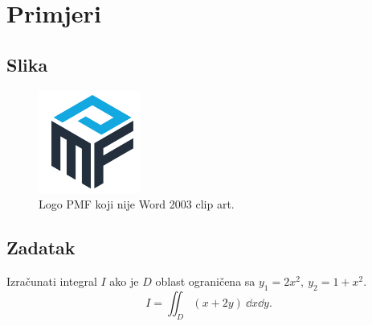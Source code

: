 
\section{Primjeri}

\subsection{Slika}
\begin{figure}[h]
	\begin{center}
		\includegraphics[width=0.3\textwidth]{pmf.png}
		\caption{Logo PMF koji nije Word 2003 clip art.}
	\end{center}
\end{figure}

\subsection{Zadatak}
\begin{zadatak}
	\label{prvi-integral}
	Izračunati integral $I$ ako je $D$ oblast ograničena sa $y_1=2x^2, \ y_2 = 1+x^2$.
	\[
		I = \iint_D (x+2y) \ \dd{x} \dd{y}
		.\]
\end{zadatak}

